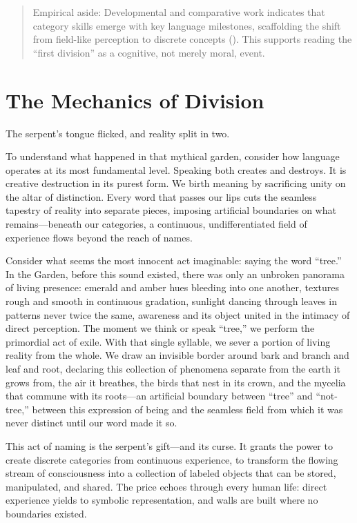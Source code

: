 \begin{quote}\small
Empirical aside: Developmental and comparative work indicates that category skills emerge with key language milestones, scaffolding the shift from field-like perception to discrete concepts (\parencite{tomasello2008origins,deacon1997symbolic}). This supports reading the “first division” as a cognitive, not merely moral, event.
\end{quote}

\section{The Mechanics of Division}

The serpent's tongue flicked, and reality split in two.

To understand what happened in that mythical garden, consider how language operates at its most fundamental level. Speaking both creates and destroys. It is creative destruction in its purest form. We birth meaning by sacrificing unity on the altar of distinction. Every word that passes our lips cuts the seamless tapestry of reality into separate pieces, imposing artificial boundaries on what remains—beneath our categories, a continuous, undifferentiated field of experience flows beyond the reach of names.

Consider what seems the most innocent act imaginable: saying the word “tree.” In the Garden, before this sound existed, there was only an unbroken panorama of living presence: emerald and amber hues bleeding into one another, textures rough and smooth in continuous gradation, sunlight dancing through leaves in patterns never twice the same, awareness and its object united in the intimacy of direct perception. The moment we think or speak “tree,” we perform the primordial act of exile. With that single syllable, we sever a portion of living reality from the whole. We draw an invisible border around bark and branch and leaf and root, declaring this collection of phenomena separate from the earth it grows from, the air it breathes, the birds that nest in its crown, and the mycelia that commune with its roots—an artificial boundary between “tree” and “not-tree,” between this expression of being and the seamless field from which it was never distinct until our word made it so.

This act of naming is the serpent's gift—and its curse. It grants the power to create discrete categories from continuous experience, to transform the flowing stream of consciousness into a collection of labeled objects that can be stored, manipulated, and shared. The price echoes through every human life: direct experience yields to symbolic representation, and walls are built where no boundaries existed.

